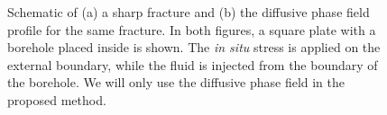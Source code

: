 \begin{figure}[htbp]
    \centering
    \centering %
        \caption{{Schematic of (a) a sharp fracture and (b) the diffusive phase field profile for the same fracture.} {In both figures, a} square plate with a borehole placed inside is shown. The \emph{in situ} stress is applied on the external boundary, while the fluid is injected from the boundary of the borehole. {We will only use the diffusive phase field in the proposed method.}%
        }
    \label{Fig:compute_domain}
\end{figure}


